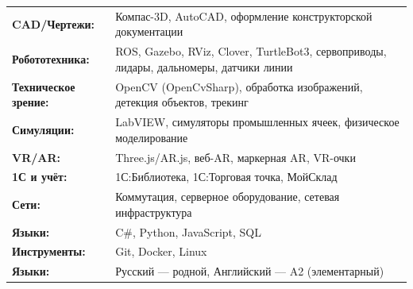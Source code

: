 \documentclass[10pt,a4paper]{article}
\begin{document}
\begin{tabular}{p{3.5cm} p{12cm}}
    \textbf{CAD/Чертежи:} & Компас-3D, AutoCAD, оформление конструкторской документации \\
    \textbf{Робототехника:} & ROS, Gazebo, RViz, Clover, TurtleBot3, сервоприводы, лидары, дальномеры, датчики линии \\
    \textbf{Техническое зрение:} & OpenCV (OpenCvSharp), обработка изображений, детекция объектов, трекинг \\
    \textbf{Симуляции:} & LabVIEW, симуляторы промышленных ячеек, физическое моделирование \\
    \textbf{VR/AR:} & Three.js/AR.js, веб-AR, маркерная AR, VR-очки \\
    \textbf{1С и учёт:} & 1С:Библиотека, 1С:Торговая точка, МойСклад \\
    \textbf{Сети:} & Коммутация, серверное оборудование, сетевая инфраструктура \\
    \textbf{Языки:} & C\#, Python, JavaScript, SQL \\
    \textbf{Инструменты:} & Git, Docker, Linux \\
    \textbf{Языки:} & Русский — родной, Английский — A2 (элементарный)
\end{tabular}

\end{document}
